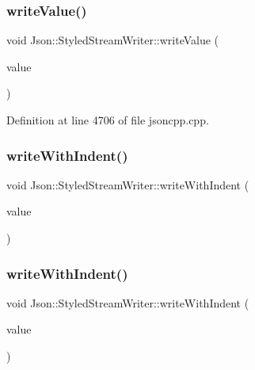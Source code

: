 \subsubsection{\texorpdfstring{write\+Value()}{writeValue()}\hspace{0.1cm}{\footnotesize\ttfamily [2/2]}}
{\footnotesize\ttfamily void Json\+::\+Styled\+Stream\+Writer\+::write\+Value (\begin{DoxyParamCaption}\item[{const \hyperlink{class_json_1_1_value}{Value} \&}]{value }\end{DoxyParamCaption})\hspace{0.3cm}{\ttfamily [private]}}



Definition at line 4706 of file jsoncpp.\+cpp.

\hypertarget{class_json_1_1_styled_stream_writer_a4e64789373b359c9b7a7244509b918fc}{}\label{class_json_1_1_styled_stream_writer_a4e64789373b359c9b7a7244509b918fc} 
\subsubsection{\texorpdfstring{write\+With\+Indent()}{writeWithIndent()}\hspace{0.1cm}{\footnotesize\ttfamily [1/2]}}
{\footnotesize\ttfamily void Json\+::\+Styled\+Stream\+Writer\+::write\+With\+Indent (\begin{DoxyParamCaption}\item[{const \hyperlink{config_8h_a1e723f95759de062585bc4a8fd3fa4be}{J\+S\+O\+N\+C\+P\+P\+\_\+\+S\+T\+R\+I\+NG} \&}]{value }\end{DoxyParamCaption})\hspace{0.3cm}{\ttfamily [private]}}

\hypertarget{class_json_1_1_styled_stream_writer_a4e64789373b359c9b7a7244509b918fc}{}\label{class_json_1_1_styled_stream_writer_a4e64789373b359c9b7a7244509b918fc} 
\subsubsection{\texorpdfstring{write\+With\+Indent()}{writeWithIndent()}\hspace{0.1cm}{\footnotesize\ttfamily [2/2]}}
{\footnotesize\ttfamily void Json\+::\+Styled\+Stream\+Writer\+::write\+With\+Indent (\begin{DoxyParamCaption}\item[{const \hyperlink{config_8h_a1e723f95759de062585bc4a8fd3fa4be}{J\+S\+O\+N\+C\+P\+P\+\_\+\+S\+T\+R\+I\+NG} \&}]{value }\end{DoxyParamCaption})\hspace{0.3cm}{\ttfamily [private]}}



